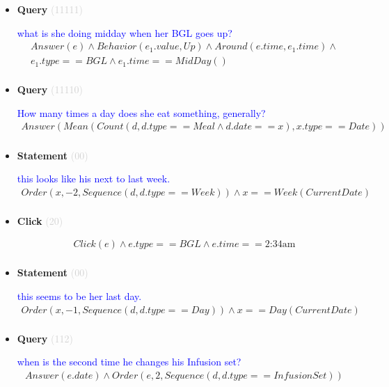 \documentclass[11pt]{article}
\newcommand{\key}[1]{\textcolor{lightgray}{#1}}
\newcounter{CQuery}
\newcounter{CStatement}
\newcounter{CClick}
\begin{document}
\begin{itemize}
\item
\textbf{Query\theCQuery} \key{(11111)} \addtocounter{CQuery}{1}
\textcolor{blue}{ what is she doing midday when her BGL goes up? }
\begin{multline*}
Answer(e) \wedge Behavior(e_1.value, Up) \wedge Around(e.time, e_1.time) \wedge \\ 
e_1.type==BGL \wedge e_1.time==MidDay() \\ 
\end{multline*}


\item
\textbf{Query\theCQuery} \key{(11110)} \addtocounter{CQuery}{1}
\textcolor{blue}{ How many times a day does she eat something, generally? }
\begin{multline*}
Answer(Mean(Count(d, d.type==Meal \wedge d.date==x), x.type==Date)) \\ 
\end{multline*}


\item
\textbf{Statement\theCStatement} \key{(00)} \addtocounter{CStatement}{1}
\textcolor{blue}{ this looks like his next to last week. }
\begin{multline*}
Order(x, -2, Sequence(d, d.type==Week)) \wedge x==Week(CurrentDate) \\ 
\end{multline*}


\item
\textbf{Click\theCClick} \key{(20)} \addtocounter{CClick}{1}
\textcolor{blue}{  }
\begin{multline*}
Click(e) \wedge e.type==BGL \wedge e.time==\mbox{2:34am} \\ 
\end{multline*}


\item
\textbf{Statement\theCStatement} \key{(00)} \addtocounter{CStatement}{1}
\textcolor{blue}{ this seems to be her last day. }
\begin{multline*}
Order(x, -1, Sequence(d, d.type==Day)) \wedge x==Day(CurrentDate) \\ 
\end{multline*}


\item
\textbf{Query\theCQuery} \key{(112)} \addtocounter{CQuery}{1}
\textcolor{blue}{ when is the second time he changes his Infusion set? }
\begin{multline*}
Answer(e.date) \wedge Order(e, 2, Sequence(d, d.type==InfusionSet)) \\ 
\end{multline*}



\end{itemize}
\end{document}
